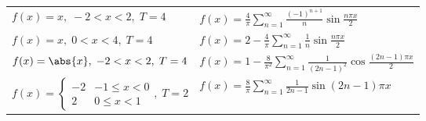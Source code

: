 \documentclass[a4paper,table]{report}
\begin{document}
\begin{tabular}{ll}
  $ f(x) = x, \; -2<x<2, \; T=4 $ & $ f(x) = \frac{4}{\pi} \sum_{n=1}^{\infty}
  \frac{(-1)^{n+1}}{n} \sin{\frac{n \pi x}{2}} $ \\
  $ f(x) = x, \; 0<x<4, \; T=4 $ & $ f(x) = 2 - \frac{4}{\pi} \sum_{n=1}^{\infty}
  \frac{1}{n} \sin{\frac{n \pi x}{2}} $ \\
  $ f(x) = \abs{x}, \; -2<x<2, \; T=4 $ & $ f(x) = 1 - \frac{8}{\pi^{2}} 
  \sum_{n=1}^{\infty} \frac{1}{(2n-1)^{2}} \cos{\frac{(2n-1) \pi x}{2}} $ \\
  $ f(x) = 
  \begin{cases} -2 & -1 \leq x<0 \\ 2 & 0 \leq x < 1 \end{cases}, \; T=2$ & 
  $ f(x) = \frac{8}{\pi} \sum_{n=1}^{\infty} \frac{1}{2n-1} \sin{(2n-1) \pi x} $
\end{tabular}


\end{document}
